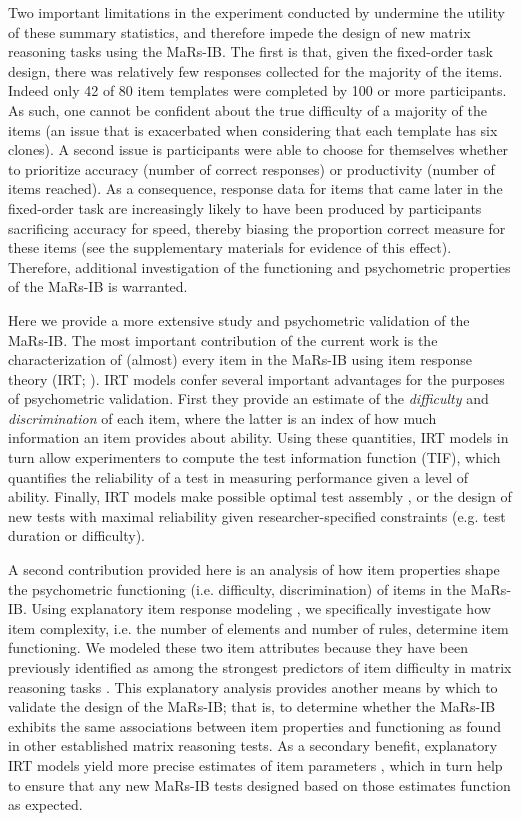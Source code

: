 \documentclass[a4paper,man,natbib]{apa6}
\begin{document}
Two important limitations in the experiment conducted by \cite{chierchia2019matrix} undermine the utility of these summary statistics, and therefore impede the design of new matrix reasoning tasks using the MaRs-IB. The first is that, given the fixed-order task design,  there was relatively few responses collected for the majority of the items. Indeed only 42 of 80 item templates were completed by 100 or more participants. As such, one cannot be confident about the true difficulty of a majority of the items (an issue that is exacerbated when considering that each template has six clones). A second issue is participants were able to choose for themselves whether to prioritize accuracy (number of correct responses) or productivity (number of items reached). As a consequence, response data for items that came later in the fixed-order task are increasingly likely to have been produced by participants sacrificing accuracy for speed, thereby biasing the proportion correct measure for these items (see the supplementary materials for evidence of this effect). Therefore, additional investigation of the functioning and psychometric properties of the MaRs-IB is warranted.

Here we provide a more extensive study and psychometric validation of the MaRs-IB. The most important contribution of the current work is the characterization of (almost) every item in the MaRs-IB using item response theory (IRT; \citealt{embretson2013item, de2013theory}). IRT models confer several important advantages for the purposes of psychometric validation. First they provide an estimate of the \textit{difficulty} and \textit{discrimination} of each item, where the latter is an index of how much information an item provides about ability. Using these quantities, IRT models in turn allow experimenters to compute the test information function (TIF), which quantifies the reliability of a test in measuring performance given a level of ability. Finally, IRT models make possible optimal test assembly  \citep{van1998optimal}, or the design of new tests with maximal reliability given researcher-specified constraints (e.g. test duration or difficulty).

A second contribution provided here is an analysis of how item properties shape the psychometric functioning (i.e. difficulty, discrimination) of items in the MaRs-IB. Using explanatory item response modeling \citep{de2004explanatory, wilson2008explanatory}, we specifically investigate how item complexity, i.e. the number of elements and number of rules, determine item functioning. We modeled these two item attributes because they have been previously identified as among the strongest predictors of item difficulty in matrix reasoning tasks \citep{embretson1998cognitive, primi2001complexity}. This explanatory analysis provides another means by which to validate the design of the MaRs-IB; that is, to determine whether the MaRs-IB exhibits the same associations between item properties and functioning as found in other established matrix reasoning tests. As a secondary benefit, explanatory IRT models yield more precise estimates of item parameters \citep{neuhaus2006separating}, which in turn help to ensure that any new MaRs-IB tests designed based on those estimates function as expected.
\end{document}
